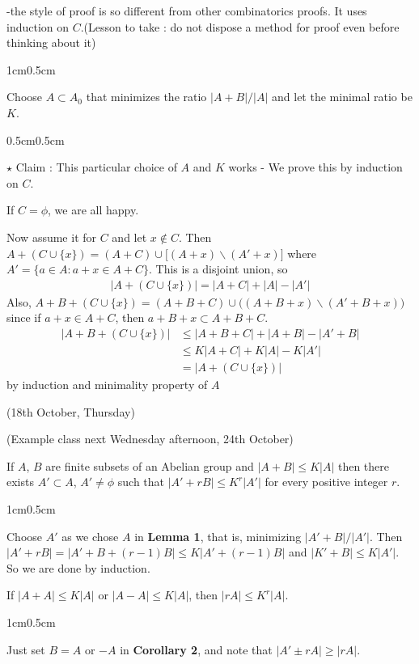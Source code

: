 \documentclass[12pt,a4paper]{report}
\newenvironment{proof}
{\begin{changemargin}{1cm}{0.5cm}
	}%
	{\end{changemargin}
}
\newenvironment{subproof}
{\begin{changemargin}{0.5cm}{0.5cm}
	}%
	{\end{changemargin}
}
\begin{document}
-the style of proof is so different from other combinatorics proofs. It uses induction on $C$.(Lesson to take : do not dispose a method for proof even before thinking about it)
\begin{proof}
\pf Choose $A \subset A_0$ that minimizes the ratio $|A+B|/|A|$ and let the minimal ratio be $K$.

\begin{subproof}
$\star$ Claim : This particular choice of $A$ and $K$ works - We prove this by induction on $C$.

\pf If $C=\phi$, we are all happy.

Now assume it for $C$ and let $x\notin C$. Then $A+(C \cup \{x\}) = (A+C) \cup \Big[ (A+x) \backslash (A'+x) \Big]$ where $A' = \{a\in A: a+x\in A+ C\}$. This is a disjoint union, so
\begin{align*}
|A+(C\cup \{x\})| = |A+C| + |A| - |A'|
\end{align*}
Also, $A+B + (C\cup \{x\}) = (A+B+C) \cup \big( (A+B+x) \backslash (A'+B+x)\big)$ since if $a+x\in A+C$, then $a+B+x \subset A+B+C$.
\begin{align*}
|A+B+(C\cup \{x \}) | &\leq |A+B+C| + |A+B| - |A'+B| \\
&\leq K|A+C| + K|A| - K|A'| \\
& = |A+(C\cup \{x\})|
\end{align*}
by induction and minimality property of $A$
\end{subproof}

\eop
\end{proof}
\s

\newday

(18th October, Thursday)
\s

(Example class next Wednesday afternoon, 24th October)
\s

 If $A$, $B$ are finite subsets of an Abelian group and $|A+ B|\leq K|A|$ then there exists $A' \subset A$, $A' \neq \phi$ such that $|A' + rB| \leq K^r|A'|$ for every positive integer $r$.
\begin{proof}
\pf Choose $A'$ as we chose $A$ in \textbf{Lemma 1}, that is, minimizing $|A'+B|/|A'|$. Then $|A' + rB| = |A'+B +(r-1)B| \leq K |A' + (r-1)B|$ and $|K' + B| \leq K|A'|$. So we are done by induction.

\eop
\end{proof}
\s

 If $|A+A| \leq K|A|$ or $|A-A| \leq K|A|$, then $|rA| \leq K^r |A|$.
\begin{proof}
\pf Just set $B= A$ or $-A$ in \textbf{Corollary 2}, and note that $|A' \pm rA| \geq |rA|$.

\eop
\end{proof}
\s
\end{document}
